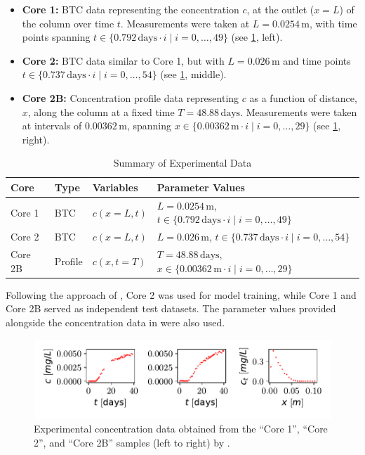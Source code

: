 \begin{itemize}
    \item \textbf{Core 1:} BTC data representing the concentration $c$, at the outlet ($x = L$) of the column over time $t$. Measurements were taken at $L = 0.0254\,\text{m}$, with time points spanning $t \in \{0.792\,\text{days} \cdot i \mid i = 0, \dots, 49\}$ (see \cref{fig:core_data}, left).
    \item \textbf{Core 2:} BTC data similar to Core 1, but with $L = 0.026\,\text{m}$ and time points $t \in \{0.737\,\text{days} \cdot i \mid i = 0, \dots, 54\}$ (see \cref{fig:core_data}, middle).
    \item \textbf{Core 2B:} Concentration profile data representing $c$ as a function of distance, $x$, along the column at a fixed time $T = 48.88\,\text{days}$. Measurements were taken at intervals of $0.00362\,\text{m}$, spanning $x \in \{0.00362\,\text{m} \cdot i \mid i = 0, \dots, 29\}$ (see \cref{fig:core_data}, right).
\end{itemize}

\begin{table}[h!]
    \centering
    \caption{Summary of Experimental Data}
    \label{tab:experimental_data}
    \begin{tabular}{llll}
        \toprule
        Core   & Type       & Variables                 & Parameter Values                                      \\
        \midrule
        Core 1 & BTC        & $c(x=L, t)$              & $L = 0.0254\,\text{m}$, $t \in \{0.792\,\text{days} \cdot i \mid i = 0, \dots, 49\}$ \\
        Core 2 & BTC        & $c(x=L, t)$              & $L = 0.026\,\text{m}$, $t \in \{0.737\,\text{days} \cdot i \mid i = 0, \dots, 54\}$  \\
        Core 2B & Profile    & $c(x, t=T)$              & $T = 48.88\,\text{days}$, $x \in \{0.00362\,\text{m} \cdot i \mid i = 0, \dots, 29\}$ \\
        \bottomrule
    \end{tabular}
\end{table}

Following the approach of \textcite{finn}, Core 2 was used for model training, while Core 1 and Core 2B served as independent test datasets. The parameter values provided alongside the concentration data in \textcite{nowak2016entropy} were also used.


\begin{figure}[h]
    \centering
    \includegraphics{figs/core_data.pdf}
    \caption{Experimental concentration data obtained from the ``Core 1'', ``Core 2'', and ``Core 2B'' samples (left to right) by \textcite{nowak2016entropy}.}
    \label{fig:core_data}
\end{figure}



